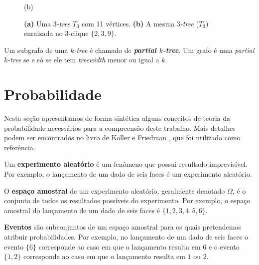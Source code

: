 \begin{definition}
\begin{figure}
\begin{minipage}{0.5\textwidth}

      (b)
    \end{minipage}

    \caption{
      \textbf{(a)} Uma \emph{$3$-tree} $T_3$ com 11 vértices.
      \textbf{(b)} A mesma \emph{$3$-tree} ($T_3$) enraizada no $3$-clique $\{2, 3, 9\}$.
    }
    \label{fig:rootedktree}
  \end{figure}
\end{definition}

\begin{definition}
  \cite{bodlaender} Um subgrafo de uma \emph{$k$-tree} é chamado de \textbf{\emph{partial $k$-tree}}. Um grafo é uma \emph{partial $k$-tree} se e só se ele tem \emph{treewidth} menor ou igual a $k$. %
\end{definition}

\section{Probabilidade}

Nesta seção apresentamos de forma sintética alguns conceitos de teoria da probabilidade necessários para a compreensão deste trabalho. Mais detalhes podem ser encontrados no livro de Koller e Friedman \cite{koller}, que foi utilizado como referência.

Um \textbf{experimento aleatório} é um fenômeno que possui resultado imprevisível. Por exemplo, o lançamento de um dado de seis faces é um experimento aleatório.

O \textbf{espaço amostral} de um experimento aleatório, geralmente denotado $\Omega$, é o conjunto de todos os resultados possíveis do experimento. Por exemplo, o espaço amostral do lançamento de um dado de seis faces é $\{1, 2, 3, 4, 5, 6\}$.

\textbf{Eventos} são subconjuntos de um espaço amostral para os quais pretendemos atribuir probabilidades. Por exemplo, no lançamento de um dado de seis faces o evento $\{6\}$ corresponde ao caso em que o lançamento resulta em $6$ e o evento $\{1, 2\}$ corresponde ao caso em que o lançamento resulta em $1$ ou $2$.

